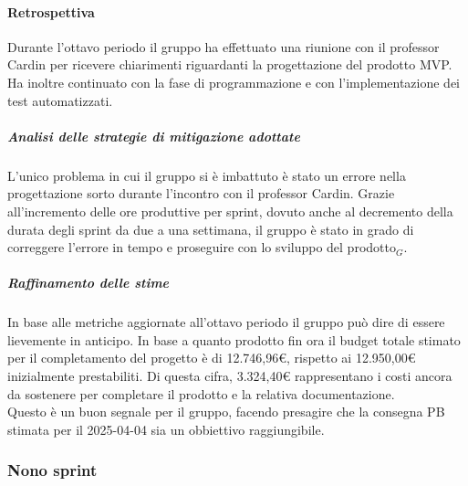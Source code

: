 \documentclass[10pt]{article}
\begin{document}
{{{{{{{{{        \paragraph{Retrospettiva}\mbox{}\vspace{0.4em}

        Durante l'ottavo periodo il gruppo ha effettuato una riunione con il professor Cardin per ricevere chiarimenti riguardanti la progettazione del prodotto MVP.
        Ha inoltre continuato con la fase di programmazione e con l'implementazione dei test automatizzati.\\

        \subparagraph{Analisi delle strategie di mitigazione adottate}\mbox{}\vspace{0.4em}

        L'unico problema in cui il gruppo si è imbattuto è stato un errore nella progettazione sorto durante l'incontro con il professor Cardin.
        Grazie all'incremento delle ore produttive per sprint, dovuto anche al decremento della durata degli sprint da due a una settimana, il gruppo è stato in grado di correggere l'errore in tempo e proseguire con lo sviluppo del prodotto$_G$.

        \subparagraph{Raffinamento delle stime}\mbox{}\vspace{0.4em}

        In base alle metriche aggiornate all'ottavo periodo il gruppo può dire di essere lievemente in anticipo.
        In base a quanto prodotto fin ora il budget totale stimato per il completamento del progetto è di 12.746,96€, rispetto ai 12.950,00€ inizialmente prestabiliti.
        Di questa cifra, 3.324,40€ rappresentano i costi ancora da sostenere per completare il prodotto e la relativa documentazione.\\
        Questo è un buon segnale per il gruppo, facendo presagire che la consegna PB stimata per il 2025-04-04 sia un obbiettivo raggiungibile.


    \newpage
    \subsubsection{Nono sprint}
    \label{nono-sprint$_G$}

}}}}}}}}}
\end{document}
